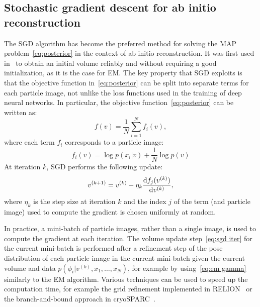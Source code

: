 \documentclass{article}
\begin{document}
\subsection{Stochastic gradient descent for ab initio reconstruction}

The SGD algorithm has become the preferred method
for solving the MAP problem~\eqref{eq:posterior} in the context of ab initio
reconstruction. It was first used in~\cite{punjani_cryosparc_2017} to obtain an initial
volume reliably and without requiring a good initialization, as it is the case
for EM. The key property that SGD exploits is that the objective function 
in~\eqref{eq:posterior} can be split into separate terms for each particle image,
not unlike the loss functions used in the training of deep neural 
networks. In particular, %
the objective function~\eqref{eq:posterior} can be written as:
\begin{equation}
    f(v) = \frac{1}{N}\sum_{i=1}^N f_i(v),
    \label{eq:f sgd}
\end{equation}
where each term $f_i$ corresponds to a particle image:
\begin{equation*}
    f_i(v) = \log p(x_i|v) + \frac{1}{N} \log p(v)
\end{equation*}
At iteration $k$, SGD performs the following update:
\begin{equation}
    v^{(k+1)} = v^{(k)} - \eta_k \frac{\dif f_j(v^{(k)})}{\dif v^{(k)}},
    \label{eq:sgd iter}
\end{equation}
where $\eta_k$ is the step size at iteration $k$ and the index $j$ of the term 
(and particle image) used to compute the gradient is chosen uniformly at random. 

In practice, a mini-batch of particle images, rather than a single image, is used 
to compute the gradient at each iteration. The volume update step~\eqref{eq:sgd iter}
for the current mini-batch is performed after a refinement step of the pose 
distribution of each particle image in the current mini-batch given the current 
volume and data $p(\phi_i | v^{(k)}, x_1,\ldots,x_N)$, for example by 
using~\eqref{eq:em gamma} similarly to the EM algorithm. Various techniques can 
be used to speed up the computation time, for example the grid refinement 
implemented in RELION~\cite{scheres_relion_2012} or the branch-and-bound approach 
in cryoSPARC~\cite{punjani_cryosparc_2017}.
\end{document}
